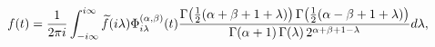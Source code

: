\[f(t)=\frac{1}{2\pi i}\int_{-i\infty}^{i\infty}\widetilde{f}(i\lambda)\Phi^{(%
\alpha,\beta)}_{i\lambda}(t)\frac{\mathop{\Gamma\/}\nolimits\!\left(\tfrac{1}{%
2}(\alpha+\beta+1+\lambda)\right)\mathop{\Gamma\/}\nolimits\!\left(\tfrac{1}{2%
}(\alpha-\beta+1+\lambda)\right)}{\mathop{\Gamma\/}\nolimits\!\left(\alpha+1%
\right)\mathop{\Gamma\/}\nolimits\!\left(\lambda\right)2^{\alpha+\beta+1-%
\lambda}}d\lambda,\]
